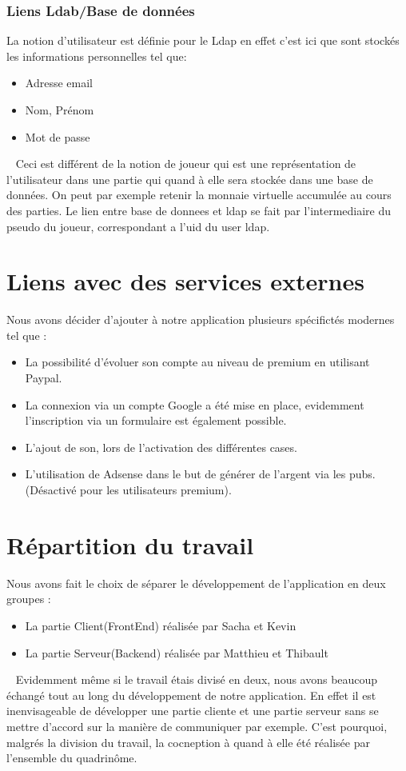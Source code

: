 \documentclass[12pt]{article}
\begin{document}
\subsubsection{Liens Ldab/Base de données}
La notion d'utilisateur est définie pour le Ldap en effet c'est ici que sont stockés les informations personnelles tel que:
\begin{itemize}
\item Adresse email
\item Nom, Prénom
\item Mot de passe
\end{itemize}
~\newline
Ceci est différent de la notion de joueur qui est une représentation de l'utilisateur dans une partie qui quand à elle sera stockée dans une base de données. On peut par exemple retenir la monnaie virtuelle accumulée au cours des parties. Le lien entre base de donnees et ldap se fait par l'intermediaire du pseudo du joueur, correspondant a l'uid du user ldap.


\section{Liens avec des services externes}
Nous avons décider d'ajouter à notre application plusieurs spécifictés modernes tel que : 
~\newline
\begin{itemize}
\item La possibilité d'évoluer son compte au niveau de premium en utilisant Paypal.
\item La connexion via un compte Google a été mise en place, evidemment l'inscription via un formulaire est également possible.
\item L'ajout de son, lors de l'activation des différentes cases.
\item L'utilisation de Adsense dans le but de générer de l'argent via les pubs. (Désactivé pour les utilisateurs premium).
\end{itemize}
\section{Répartition du travail}
Nous avons fait le choix de séparer le développement de l'application en deux groupes :
~\newline 
\begin{itemize}
\item La partie Client(FrontEnd) réalisée par Sacha et Kevin
\item La partie Serveur(Backend) réalisée par Matthieu et Thibault
\end{itemize}
~\newline
Evidemment même si le travail étais divisé en deux, nous avons beaucoup échangé tout au long du développement de notre application. En effet il est inenvisageable de développer une partie cliente et une partie serveur sans se mettre d'accord sur la manière de communiquer par exemple. C'est pourquoi, malgrés la division du travail, la cocneption à quand à elle été réalisée par l'ensemble du quadrinôme.
\end{document}
